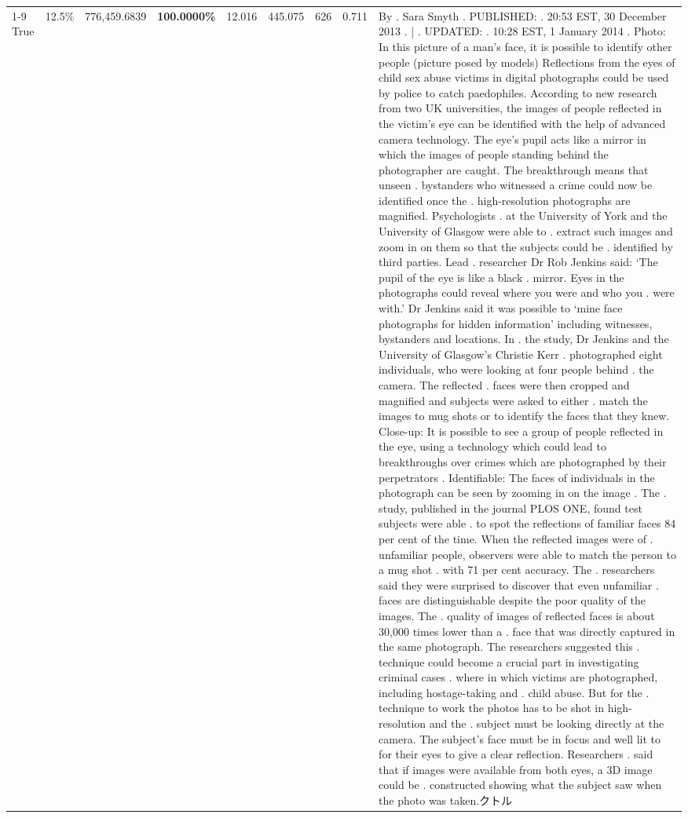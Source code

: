 \begin{table}[H]
\begin{tabular}{lllrlllll}
\cline{1-9}
True & 12.5\% & 776,459.6839 & \bfseries \color{red} 100.0000\% & 12.016 & 445.075 & 626 & 0.711 & By . Sara Smyth . PUBLISHED: . 20:53 EST, 30 December 2013 . | . UPDATED: . 10:28 EST, 1 January 2014 . Photo: In this picture of a man's face, it is possible to identify other people (picture posed by models) Reflections from the eyes of child sex abuse victims in digital photographs could be used by police to catch paedophiles. According to new research from two UK universities, the images of people reflected in the victim's eye can be identified with the help of advanced camera technology. The eye's pupil acts like a mirror in which the images of people standing behind the photographer are caught. The breakthrough means that unseen . bystanders who witnessed a crime could now be identified once the . high-resolution photographs are magnified. Psychologists . at the University of York and the University of Glasgow were able to . extract such images and zoom in on them so that the subjects could be . identified by third parties. Lead . researcher Dr Rob Jenkins said: ‘The pupil of the eye is like a black . mirror. Eyes in the photographs could reveal where you were and who you . were with.' Dr Jenkins said it was possible to ‘mine face photographs for hidden information' including witnesses, bystanders and locations. In . the study, Dr Jenkins and the University of Glasgow's Christie Kerr . photographed eight individuals, who were looking at four people behind . the camera. The reflected . faces were then cropped and magnified and subjects were asked to either . match the images to mug shots or to identify the faces that they knew. Close-up: It is possible to see a group of people reflected in the eye, using a technology which could lead to breakthroughs over crimes which are photographed by their perpetrators . Identifiable: The faces of individuals in the photograph can be seen by zooming in on the image . The . study, published in the journal PLOS ONE, found test subjects were able . to spot the reflections of familiar faces 84 per cent of the time. When the reflected images were of . unfamiliar people, observers were able to match the person to a mug shot . with 71 per cent accuracy. The . researchers said they were surprised to discover that even unfamiliar . faces are distinguishable despite the poor quality of the images. The . quality of images of reflected faces is about 30,000 times lower than a . face that was directly captured in the same photograph. The researchers suggested this . technique could become a crucial part in investigating criminal cases . where in which victims are photographed, including hostage-taking and . child abuse. But for the . technique to work the photos has to be shot in high-resolution and the . subject must be looking directly at the camera. The subject's face must be in focus and well lit to for their eyes to give a clear reflection. Researchers . said that if images were available from both eyes, a 3D image could be . constructed showing what the subject saw when the photo was taken.クトル \\

\end{tabular}
\end{table}
